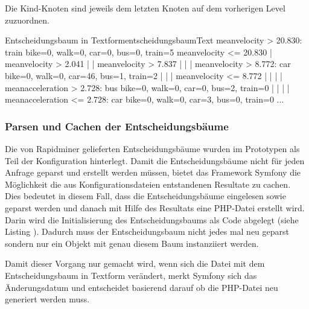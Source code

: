Die Kind-Knoten sind jeweils dem letzten Knoten auf dem vorherigen Level zuzuordnen.

\begin{code}[]{Entscheidungsbaum in Textform}{entscheidungsbaumText}
meanvelocity > 20.830: train {bike=0, walk=0, car=0, bus=0, train=5}
meanvelocity <= 20.830
|   meanvelocity > 2.041
|   |   meanvelocity > 7.837
|   |   |   meanvelocity > 8.772: car {bike=0, walk=0, car=46, bus=1, train=2}
|   |   |   meanvelocity <= 8.772
|   |   |   |   meanacceleration > 2.728: bus {bike=0, walk=0, car=0, bus=2, train=0}
|   |   |   |   meanacceleration <= 2.728: car {bike=0, walk=0, car=3, bus=0, train=0}
...
\end{code}

\subsubsection{Parsen und Cachen der Entscheidungsbäume}
Die von Rapidminer gelieferten Entscheidungsbäume wurden im Prototypen als Teil der Konfiguration hinterlegt. Damit die Entscheidungsbäume nicht für jeden Anfrage geparst und erstellt werden müssen, bietet das Framework Symfony die Möglichkeit die aus Konfigurationsdateien entstandenen Resultate zu cachen. Dies bedeutet in diesem Fall, dass die Entscheidungsbäume eingelesen sowie geparst werden und danach mit Hilfe des Resultats eine PHP-Datei erstellt wird. Darin wird die Initialisierung des Entscheidungsbaums als Code abgelegt (siehe Listing ). Dadurch muss der Entscheidungsbaum nicht jedes mal neu geparst sondern nur ein Objekt mit genau diesem Baum instanziiert werden. 

\begin{code}[PHP]{Ausschnitt des generierten Entscheidungsbaums als PHP-Klasse}{entscheidungsbaumPHP}
...
class BasicDecisionTree implements DecisionTreeInterface
{
    protected $tree;

    function __construct()
    {
        $node0 = new Node();
        $node0->setDecision(new Decision('meanvelocity', '>', 20.83));
        $node1 = new Node();
        $node1->setResult(new Result(0,0,0,0,5));
        ...
        $node0->setRight($node2);
        $node1->setParent($node1);
        $node2->setParent($node0);
        $node2->setLeft($node3);
        ...
\end{code}

Damit dieser Vorgang nur gemacht wird, wenn sich die Datei mit dem Entscheidungsbaum in Textform verändert, merkt Symfony sich das Änderungsdatum und entscheidet basierend darauf ob die PHP-Datei neu generiert werden muss.

